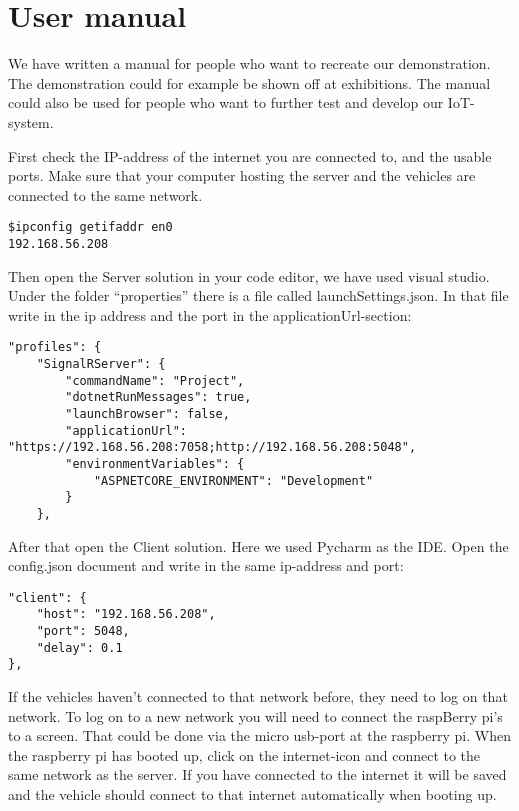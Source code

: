 \section{User manual}
We have written a manual for people who want to recreate our demonstration. The demonstration could for example be shown off at exhibitions. The manual could also be used for people who want to further test and develop our IoT-system.

First check the IP-address of the internet you are connected to, and the usable ports. Make sure that your computer hosting the server and the vehicles are connected to the same network.

\begin{lstlisting}
$ipconfig getifaddr en0
192.168.56.208
\end{lstlisting}

Then open the Server solution in your code editor, we have used visual studio. Under the folder “properties” there is a file called launchSettings.json. In that file write in the ip address and the port in the applicationUrl-section:

\begin{lstlisting}
"profiles": {
	"SignalRServer": {
		"commandName": "Project",
		"dotnetRunMessages": true,
		"launchBrowser": false,
		"applicationUrl": "https://192.168.56.208:7058;http://192.168.56.208:5048",
		"environmentVariables": {
			"ASPNETCORE_ENVIRONMENT": "Development"
		}
	},
\end{lstlisting}

After that open the Client solution. Here we used Pycharm as the IDE. Open the config.json document and write in the same ip-address and port:

\begin{lstlisting}
"client": {
	"host": "192.168.56.208",
	"port": 5048,
	"delay": 0.1
},
\end{lstlisting}

If the vehicles haven’t connected to that network before, they need to log on that network. To log on to a new network you will need to connect the raspBerry pi’s to a screen. That could be done via the micro usb-port at the raspberry pi. When the raspberry pi has booted up, click on the internet-icon and connect to the same network as the server. If you have connected to the internet it will be saved and the vehicle should connect to that internet automatically when booting up. 


